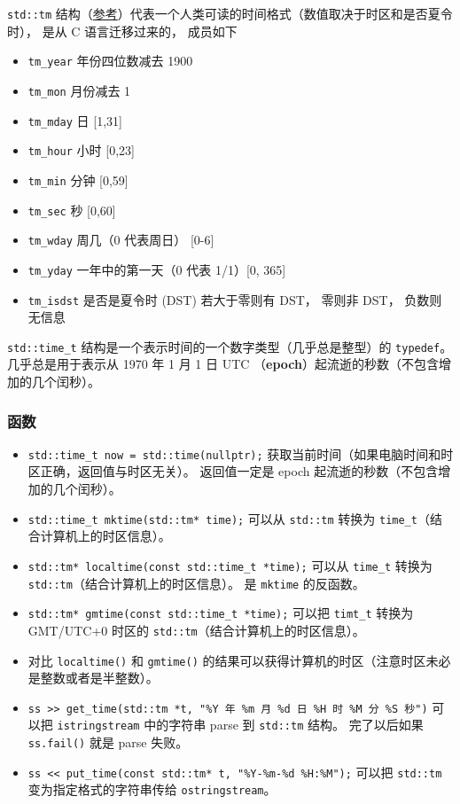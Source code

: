
\begin{issues}
\issueDraft
\end{issues}


\verb|std::tm| 结构（\href{https://en.cppreference.com/w/cpp/chrono/c/tm}{参考}）代表一个人类可读的时间格式（数值取决于时区和是否夏令时）， 是从 C 语言迁移过来的， 成员如下
\begin{itemize}
\item \verb|tm_year| 年份四位数减去 1900
\item \verb|tm_mon| 月份减去 1
\item \verb|tm_mday| 日 [1,31]
\item \verb|tm_hour| 小时 [0,23]
\item \verb|tm_min| 分钟 [0,59]
\item \verb|tm_sec| 秒 [0,60]
\end{itemize}
\begin{itemize}
\item \verb|tm_wday| 周几（0 代表周日） [0-6]
\item \verb|tm_yday| 一年中的第一天（0 代表 1/1）[0, 365]
\item \verb|tm_isdst| 是否是夏令时 (DST) 若大于零则有 DST， 零则非 DST， 负数则无信息
\end{itemize}

\verb|std::time_t| 结构是一个表示时间的一个数字类型（几乎总是整型）的 \verb|typedef|。 几乎总是用于表示从 1970 年 1 月 1 日 UTC （\textbf{epoch}）起流逝的秒数（不包含增加的几个闰秒）。

\subsubsection{函数}
\begin{itemize}
\item \verb|std::time_t now = std::time(nullptr);| 获取当前时间（如果电脑时间和时区正确，返回值与时区无关）。 返回值一定是 epoch 起流逝的秒数（不包含增加的几个闰秒）。
\item \verb|std::time_t mktime(std::tm* time);| 可以从 \verb|std::tm| 转换为 \verb|time_t|（结合计算机上的时区信息）。
\item \verb|std::tm* localtime(const std::time_t *time);| 可以从 \verb|time_t| 转换为 \verb|std::tm|（结合计算机上的时区信息）。 是 \verb|mktime| 的反函数。
\item \verb|std::tm* gmtime(const std::time_t *time);| 可以把 \verb|timt_t| 转换为 GMT/UTC+0 时区的 \verb|std::tm|（结合计算机上的时区信息）。
\item 对比 \verb|localtime()| 和 \verb|gmtime()| 的结果可以获得计算机的时区（注意时区未必是整数或者是半整数）。
\item \verb|ss >> get_time(std::tm *t, "%Y 年 %m 月 %d 日 %H 时 %M 分 %S 秒")| 可以把 \verb|istringstream| 中的字符串 parse 到 \verb|std::tm| 结构。 完了以后如果 \verb|ss.fail()| 就是 parse 失败。
\item \verb|ss << put_time(const std::tm* t, "%Y-%m-%d %H:%M");| 可以把 \verb|std::tm| 变为指定格式的字符串传给 \verb|ostringstream|。
\end{itemize}

